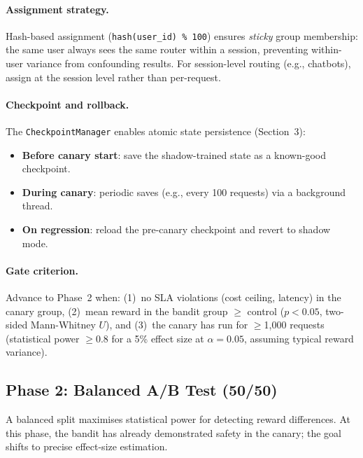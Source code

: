 \paragraph{Assignment strategy.}
Hash-based assignment (\texttt{hash(user\_id) \% 100}) ensures \emph{sticky} group membership: the same user always sees the same router within a session, preventing within-user variance from confounding results.  For session-level routing (e.g., chatbots), assign at the session level rather than per-request.

\paragraph{Checkpoint and rollback.}
The \texttt{CheckpointManager} enables atomic state persistence (Section~3):
\begin{itemize}[nosep,leftmargin=*]
    \item \textbf{Before canary start}: save the shadow-trained state as a known-good checkpoint.
    \item \textbf{During canary}: periodic saves (e.g., every 100 requests) via a background thread.
    \item \textbf{On regression}: reload the pre-canary checkpoint and revert to shadow mode.
\end{itemize}

\paragraph{Gate criterion.}
Advance to Phase~2 when: (1)~no SLA violations (cost ceiling, latency) in the canary group, (2)~mean reward in the bandit group $\geq$ control ($p < 0.05$, two-sided Mann-Whitney $U$), and (3)~the canary has run for $\geq$1{,}000 requests (statistical power $\geq$0.8 for a 5\% effect size at $\alpha{=}0.05$, assuming typical reward variance).


\subsection{Phase 2: Balanced A/B Test (50/50)}
\label{app:ab_balanced}

A balanced split maximises statistical power for detecting reward differences.  At this phase, the bandit has already demonstrated safety in the canary; the goal shifts to precise effect-size estimation.

